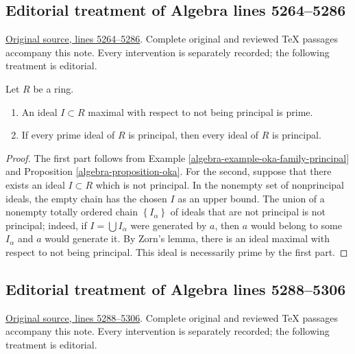 \subsection{Editorial treatment of Algebra lines 5264--5286}

\hypertarget{algebra-context-030}{}

\noindent\href{https://github.com/stacks/stacks-project/blob/a04446e57ec1fbc252a871afcec7752fb2807b14/algebra.tex\#L5264}{Original source, lines 5264--5286}. Complete original and reviewed TeX passages accompany this note. Every intervention is separately recorded; the following treatment is editorial.


\begin{lemma}
\label{editorial-source-lemma-primes-principal}
Let $R$ be a ring.
\begin{enumerate}
\item An ideal $I \subset R$ maximal with respect to not being
principal is prime.
\item If every prime ideal of $R$ is principal, then
every ideal of $R$ is principal.
\end{enumerate}
\end{lemma}

\begin{proof}
The first part follows from
Example \ref{algebra-example-oka-family-principal} and
Proposition \ref{algebra-proposition-oka}.
For the second, suppose that there exists an ideal $I \subset R$
which is not principal. In the nonempty set of nonprincipal ideals,
the empty chain has the chosen $I$ as an upper bound.
The union of a nonempty totally ordered chain
$\left\{I_\alpha\right\}$ of ideals that are not principal is not principal;
indeed, if $I = \bigcup I_\alpha$ were generated by
$a$, then $a$ would belong to some $I_\alpha $ and $a$ would generate it.
By Zorn's lemma, there is an ideal maximal with respect to not being
principal. This ideal is necessarily prime by the first part.
\end{proof}


\subsection{Editorial treatment of Algebra lines 5288--5306}

\hypertarget{algebra-context-031}{}

\noindent\href{https://github.com/stacks/stacks-project/blob/a04446e57ec1fbc252a871afcec7752fb2807b14/algebra.tex\#L5288}{Original source, lines 5288--5306}. Complete original and reviewed TeX passages accompany this note. Every intervention is separately recorded; the following treatment is editorial.


